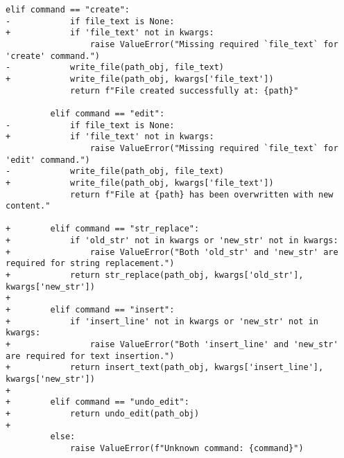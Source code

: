 \begin{lstlisting}[style=diffstyle]
         elif command == "create":
-            if file_text is None:
+            if 'file_text' not in kwargs:
                 raise ValueError("Missing required `file_text` for 'create' command.")
-            write_file(path_obj, file_text)
+            write_file(path_obj, kwargs['file_text'])
             return f"File created successfully at: {path}"
 
         elif command == "edit":
-            if file_text is None:
+            if 'file_text' not in kwargs:
                 raise ValueError("Missing required `file_text` for 'edit' command.")
-            write_file(path_obj, file_text)
+            write_file(path_obj, kwargs['file_text'])
             return f"File at {path} has been overwritten with new content."
 
+        elif command == "str_replace":
+            if 'old_str' not in kwargs or 'new_str' not in kwargs:
+                raise ValueError("Both 'old_str' and 'new_str' are required for string replacement.")
+            return str_replace(path_obj, kwargs['old_str'], kwargs['new_str'])
+
+        elif command == "insert":
+            if 'insert_line' not in kwargs or 'new_str' not in kwargs:
+                raise ValueError("Both 'insert_line' and 'new_str' are required for text insertion.")
+            return insert_text(path_obj, kwargs['insert_line'], kwargs['new_str'])
+
+        elif command == "undo_edit":
+            return undo_edit(path_obj)
+
         else:
             raise ValueError(f"Unknown command: {command}")
\end{lstlisting}
